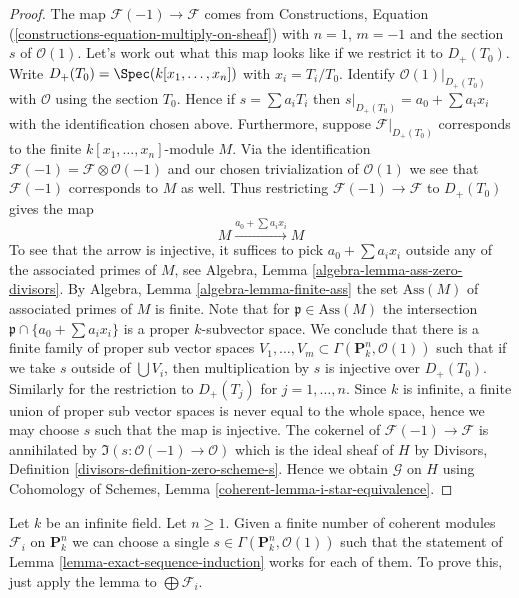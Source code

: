 \begin{proof}
The map $\mathcal{F}(-1) \to \mathcal{F}$ comes from
Constructions, Equation (\ref{constructions-equation-multiply-on-sheaf})
with $n = 1$, $m = -1$ and the section $s$ of $\mathcal{O}(1)$.
Let's work out what this map looks like if we restrict it to
$D_{+}(T_0)$. Write $D_{+}(T_0) = \Spec(k[x_1, \ldots, x_n])$
with $x_i = T_i/T_0$. Identify $\mathcal{O}(1)|_{D_{+}(T_0)}$ with
$\mathcal{O}$ using the section $T_0$. Hence if
$s = \sum a_iT_i$ then $s|_{D_{+}(T_0)} = a_0 + \sum a_ix_i$
with the identification chosen above. Furthermore, suppose
$\mathcal{F}|_{D_{+}(T_0)}$ corresponds to the finite
$k[x_1, \ldots, x_n]$-module $M$. Via the identification
$\mathcal{F}(-1) = \mathcal{F} \otimes \mathcal{O}(-1)$
and our chosen trivialization of $\mathcal{O}(1)$ we see that
$\mathcal{F}(-1)$ corresponds to $M$ as well. Thus
restricting $\mathcal{F}(-1) \to \mathcal{F}$ to $D_{+}(T_0)$ gives
the map
$$
M \xrightarrow{a_0 + \sum a_ix_i} M
$$
To see that the arrow is injective, it suffices to pick
$a_0 + \sum a_ix_i$ outside any of the associated primes of $M$, see
Algebra, Lemma \ref{algebra-lemma-ass-zero-divisors}. By
Algebra, Lemma \ref{algebra-lemma-finite-ass}
the set $\text{Ass}(M)$ of associated primes of $M$ is finite.
Note that for $\mathfrak p \in \text{Ass}(M)$ the intersection
$\mathfrak p \cap \{a_0 + \sum a_i x_i\}$ is a proper $k$-subvector space.
We conclude that there is a finite family of proper sub vector spaces
$V_1, \ldots, V_m \subset \Gamma(\mathbf{P}^n_k, \mathcal{O}(1))$
such that if we take $s$ outside of $\bigcup V_i$, then multiplication
by $s$ is injective over $D_{+}(T_0)$.
Similarly for the restriction to $D_{+}(T_j)$ for $j = 1, \ldots, n$.
Since $k$ is infinite, a finite union of proper sub vector spaces
is never equal to the whole space, hence we may choose $s$ such
that the map is injective.
The cokernel of $\mathcal{F}(-1) \to \mathcal{F}$ is annihilated
by $\Im(s : \mathcal{O}(-1) \to \mathcal{O})$ which is
the ideal sheaf of $H$ by
Divisors, Definition \ref{divisors-definition-zero-scheme-s}.
Hence we obtain $\mathcal{G}$ on $H$ using
Cohomology of Schemes, Lemma \ref{coherent-lemma-i-star-equivalence}.
\end{proof}

\begin{remark}
\label{remark-exact-sequence-induction}
Let $k$ be an infinite field. Let $n \geq 1$. Given a finite number
of coherent modules $\mathcal{F}_i$ on $\mathbf{P}^n_k$ we can choose
a single $s \in \Gamma(\mathbf{P}^n_k, \mathcal{O}(1))$ such
that the statement of Lemma \ref{lemma-exact-sequence-induction}
works for each of them.
To prove this, just apply the lemma to $\bigoplus \mathcal{F}_i$.
\end{remark}

